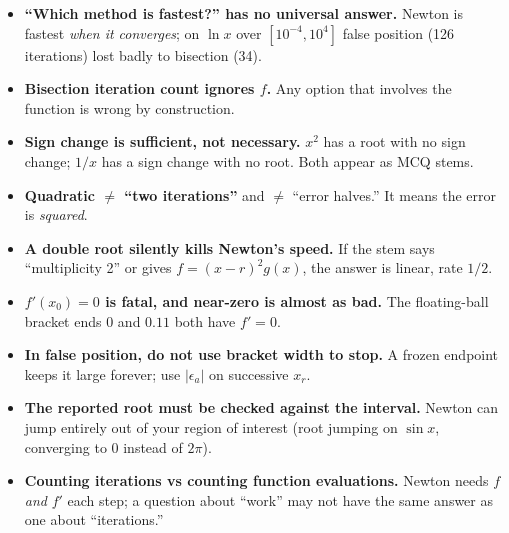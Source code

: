 \begin{trapbox}
\begin{itemize}
\item \textbf{``Which method is fastest?'' has no universal answer.} Newton is fastest \emph{when it converges}; on $\ln x$ over $[10^{-4},10^4]$ false position (126 iterations) lost badly to bisection (34).
\item \textbf{Bisection iteration count ignores $f$.} Any option that involves the function is wrong by construction.
\item \textbf{Sign change is sufficient, not necessary.} $x^2$ has a root with no sign change; $1/x$ has a sign change with no root. Both appear as MCQ stems.
\item \textbf{Quadratic $\ne$ ``two iterations''} and $\ne$ ``error halves.'' It means the error is \emph{squared}.
\item \textbf{A double root silently kills Newton's speed.} If the stem says ``multiplicity 2'' or gives $f = (x-r)^2 g(x)$, the answer is linear, rate $1/2$.
\item \textbf{$f'(x_0)=0$ is fatal, and near-zero is almost as bad.} The floating-ball bracket ends $0$ and $0.11$ both have $f'=0$.
\item \textbf{In false position, do not use bracket width to stop.} A frozen endpoint keeps it large forever; use $|\epsilon_a|$ on successive $x_r$.
\item \textbf{The reported root must be checked against the interval.} Newton can jump entirely out of your region of interest (root jumping on $\sin x$, converging to $0$ instead of $2\pi$).
\item \textbf{Counting iterations vs counting function evaluations.} Newton needs $f$ \emph{and} $f'$ each step; a question about ``work'' may not have the same answer as one about ``iterations.''
\end{itemize}
\end{trapbox}
